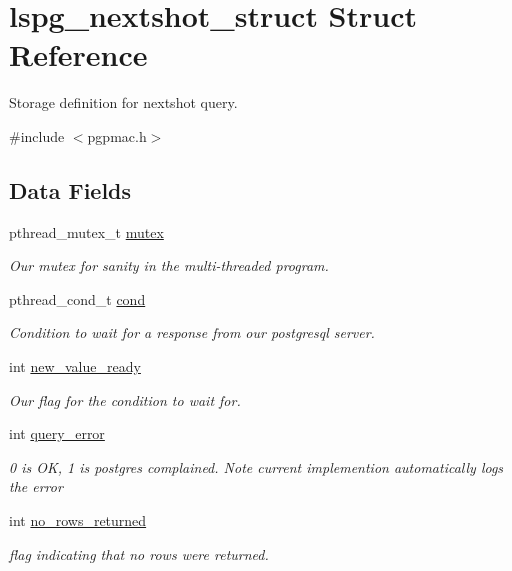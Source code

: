 \hypertarget{structlspg__nextshot__struct}{\section{lspg\-\_\-nextshot\-\_\-struct Struct Reference}
\label{structlspg__nextshot__struct}
}


Storage definition for nextshot query.  




{\ttfamily \#include $<$pgpmac.\-h$>$}

\subsection*{Data Fields}
\begin{DoxyCompactItemize}
\item 
pthread\-\_\-mutex\-\_\-t \hyperlink{structlspg__nextshot__struct_a38b657155fbee9b73278f76912cf2333}{mutex}
\begin{DoxyCompactList}\small\item\em Our mutex for sanity in the multi-\/threaded program. \end{DoxyCompactList}\item 
pthread\-\_\-cond\-\_\-t \hyperlink{structlspg__nextshot__struct_afc773a9eefc173aa98d5c2889e1d7669}{cond}
\begin{DoxyCompactList}\small\item\em Condition to wait for a response from our postgresql server. \end{DoxyCompactList}\item 
int \hyperlink{structlspg__nextshot__struct_adb8da14444b98f556dba9420dd4666dc}{new\-\_\-value\-\_\-ready}
\begin{DoxyCompactList}\small\item\em Our flag for the condition to wait for. \end{DoxyCompactList}\item 
int \hyperlink{structlspg__nextshot__struct_aa50fbe34bd93ccc3762a804e95f8fd10}{query\-\_\-error}
\begin{DoxyCompactList}\small\item\em 0 is O\-K, 1 is postgres complained. Note current implemention automatically logs the error \end{DoxyCompactList}\item 
int \hyperlink{structlspg__nextshot__struct_abc9242805729f70b83df79706c394c71}{no\-\_\-rows\-\_\-returned}
\begin{DoxyCompactList}\small\item\em flag indicating that no rows were returned. \end{DoxyCompactList}\item 

\end{DoxyCompactItemize}
